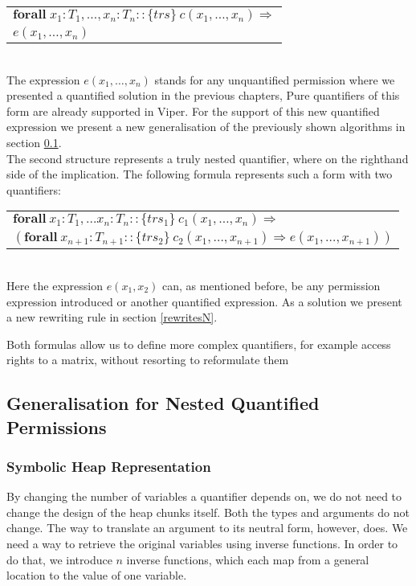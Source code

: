 \documentclass[12pt]{article}
\begin{document}
\begin{tabularx}{1\textwidth}{ X }
	\( \mathbf{forall} \; x_1:T_1, \dots, x_n: T_n ::  \{trs\}\ c(x_1, \dots, x_n) \Rightarrow \) \\
	\(e(x_1,  \dots, x_n)\)
\end{tabularx}\\

The expression \(e(x_1,  \dots, x_n)\) stands for any unquantified permission where we presented a quantified solution in the previous chapters, Pure quantifiers of this form are already supported in Viper. For the support of this new quantified expression we present a new generalisation of the previously shown algorithms in section \ref{generalN}.\\

The second structure represents a truly nested quantifier, where on the righthand side of the implication. The following formula represents such a form with two quantifiers:\\

\begin{tabularx}{1\textwidth}{ X}
      \(\mathbf{forall \ }  x_1:T_1, \dots x_n:T_n ::  \{trs_1\}\  c_1(x_1, \dots, x_n) \Rightarrow \) \\
     \( ( \mathbf{forall \ } x_{n+1}:T_{n+1} :: \{trs_2\} \ c_2(x_1, \dots, x_{n+1}) \Rightarrow e(x_1, \dots, x_{n+1}))\)
\end{tabularx}\\

Here the expression \(e(x_1, x_2)\) can, as mentioned before, be any permission expression introduced or another quantified expression. As a solution we present a new rewriting rule in section \ref{rewritesN}.

Both formulas allow us to define more complex quantifiers, for example access rights to a matrix, without resorting to reformulate them 

\subsection{Generalisation for Nested Quantified Permissions}
\label{generalN}




\subsubsection{Symbolic Heap Representation} \label{shr}
By changing the number of variables a quantifier depends on, we do not need to change the design of the heap chunks itself. Both the types and arguments do not change. The way to translate an argument to its neutral form, however, does. We need a way to retrieve the original variables using inverse functions. In order to do that, we introduce \(n\) inverse functions, which each map from a general location to the value of one variable.
\end{document}
